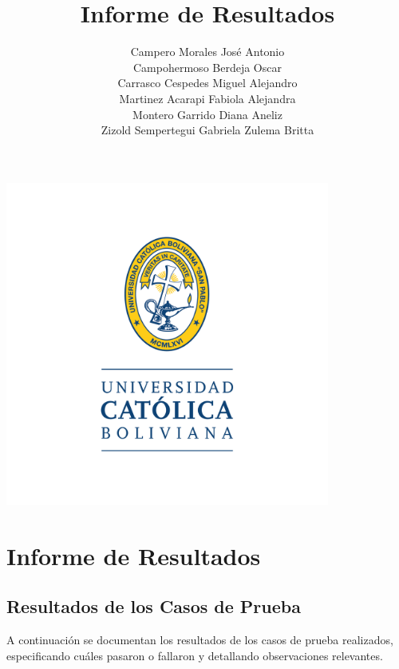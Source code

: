 \documentclass[stu, 12pt, letterpaper, donotrepeattitle, floatsintext, natbib]{apa7}
\title{\Large Informe de Resultados}
\author{
    Campero Morales José Antonio \\
    Campohermoso Berdeja Oscar \\
    Carrasco Cespedes Miguel Alejandro \\
    Martinez Acarapi Fabiola Alejandra \\
    Montero Garrido Diana Aneliz \\
    Zizold Sempertegui Gabriela Zulema Britta
}
\affiliation{Universidad Católica Boliviana}
\begin{document}
\thispagestyle{empty}

\centering
\includegraphics[width=0.8\textwidth]{../imgs/logo-ucb.png} %
\vspace{-5cm} %

\maketitle

\newpage
{}
\renewcommand\contentsname{\large Índice}
\tableofcontents
\setcounter{tocdepth}{2}
\newpage
\renewcommand{\listfigurename}{\large Índice de figuras}
\listoffigures
\newpage
\renewcommand{\listtablename}{\large Índice de tablas}
\listoftables
\newpage

\newpage
\section{\large Informe de Resultados}

\subsection{Resultados de los Casos de Prueba}

\noindent A continuación se documentan los resultados de los casos de prueba realizados, especificando cuáles pasaron o fallaron y detallando observaciones relevantes.
\end{document}
